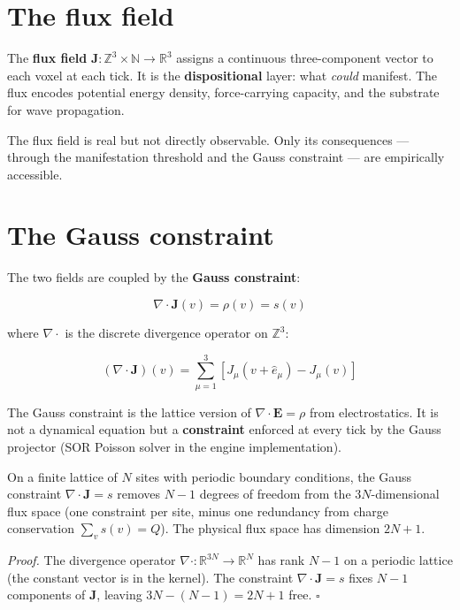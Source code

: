 \documentclass[
  11pt,
  letterpaper,
  twoside,
  openany]{book}
\makeatletter
\let\orig@section\section
\renewcommand{\section}{\needspace{8\baselineskip}\orig@section}
\makeatother
\begin{document}
\section{The flux field}\label{the-flux-field}

The \textbf{flux field}
\(\mathbf{J} : \mathbb{Z}^3 \times \mathbb{N} \to \mathbb{R}^3\) assigns
a continuous three-component vector to each voxel at each tick. It is
the \textbf{dispositional} layer: what \emph{could} manifest. The flux
encodes potential energy density, force-carrying capacity, and the
substrate for wave propagation.

The flux field is real but not directly observable. Only its
consequences --- through the manifestation threshold and the Gauss
constraint --- are empirically accessible.

\section{The Gauss constraint}\label{sec-gauss}

The two fields are coupled by the \textbf{Gauss constraint}:

\[
\nabla \cdot \mathbf{J}(v) = \rho(v) = s(v)
\tag{2.1}
\]

where \(\nabla \cdot\) is the discrete divergence operator on
\(\mathbb{Z}^3\):

\[
(\nabla \cdot \mathbf{J})(v) = \sum_{\mu = 1}^{3} \left[ J_\mu(v + \hat{e}_\mu) - J_\mu(v) \right]
\]

The Gauss constraint is the lattice version of
\(\nabla \cdot \mathbf{E} = \rho\) from electrostatics. It is not a
dynamical equation but a \textbf{constraint} enforced at every tick by
the Gauss projector (SOR Poisson solver in the engine implementation).

\begin{ftdtheorem}

On a finite lattice of \(N\) sites with periodic boundary conditions,
the Gauss constraint \(\nabla \cdot \mathbf{J} = s\) removes \(N - 1\)
degrees of freedom from the \(3N\)-dimensional flux space (one
constraint per site, minus one redundancy from charge conservation
\(\sum_v s(v) = Q\)). The physical flux space has dimension \(2N + 1\).

\end{ftdtheorem}

\emph{Proof.} The divergence operator
\(\nabla \cdot : \mathbb{R}^{3N} \to \mathbb{R}^N\) has rank \(N - 1\)
on a periodic lattice (the constant vector is in the kernel). The
constraint \(\nabla \cdot \mathbf{J} = s\) fixes \(N - 1\) components of
\(\mathbf{J}\), leaving \(3N - (N-1) = 2N + 1\) free. \(\square\)
\end{document}
